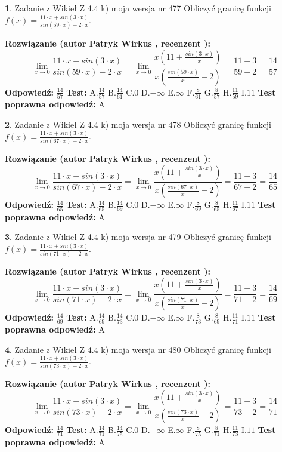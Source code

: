 \documentclass[12pt, a4paper]{article}
\theoremstyle{definition} %
\newtheorem{zad}{}
\newcommand{\zadStart}[1]{\begin{zad}#1\newline}
\newcommand{\zadStop}{\end{zad}}
\newcommand{\rozwStart}[2]{\noindent \textbf{Rozwiązanie (autor #1 , recenzent #2): }\newline}
\newcommand{\rozwStop}{\newline}
\newcommand{\odpStart}{\noindent \textbf{Odpowiedź:}\newline}
\newcommand{\odpStop}{\newline}
\newcommand{\testStart}{\noindent \textbf{Test:}\newline}
\newcommand{\testStop}{\newline}
\newcommand{\kluczStart}{\noindent \textbf{Test poprawna odpowiedź:}\newline}
\newcommand{\kluczStop}{\newline}
\begin{document}
\zadStart{Zadanie z Wikieł Z 4.4 k) moja wersja nr 477}
Obliczyć granicę funkcji $f(x)=\frac{11\cdot x +sin(3\cdot x)}{sin(59\cdot x) -2\cdot x}$.
\zadStop
\rozwStart{Patryk Wirkus}{}
$$\lim\limits_{x\to 0}\frac{11\cdot x +sin(3\cdot x)}{sin(59\cdot x) -2\cdot x}
=\lim\limits_{x\to 0}\frac{x(11+\frac{sin(3\cdot x)}{x})}{x(\frac{sin(59\cdot x)}{x}-2)}
=\frac{11+3}{59-2} = \frac{14}{57}$$
\rozwStop
\odpStart
$\frac{14}{57}$
\odpStop
\testStart
A.$\frac{14}{57}$
B.$\frac{14}{61}$
C.$0$
D.$-\infty$
E.$\infty$
F.$\frac{8}{61}$
G.$\frac{8}{57}$
H.$\frac{11}{59}$
I.$11$
\testStop
\kluczStart
A
\kluczStop



\zadStart{Zadanie z Wikieł Z 4.4 k) moja wersja nr 478}
Obliczyć granicę funkcji $f(x)=\frac{11\cdot x +sin(3\cdot x)}{sin(67\cdot x) -2\cdot x}$.
\zadStop
\rozwStart{Patryk Wirkus}{}
$$\lim\limits_{x\to 0}\frac{11\cdot x +sin(3\cdot x)}{sin(67\cdot x) -2\cdot x}
=\lim\limits_{x\to 0}\frac{x(11+\frac{sin(3\cdot x)}{x})}{x(\frac{sin(67\cdot x)}{x}-2)}
=\frac{11+3}{67-2} = \frac{14}{65}$$
\rozwStop
\odpStart
$\frac{14}{65}$
\odpStop
\testStart
A.$\frac{14}{65}$
B.$\frac{14}{69}$
C.$0$
D.$-\infty$
E.$\infty$
F.$\frac{8}{69}$
G.$\frac{8}{65}$
H.$\frac{11}{67}$
I.$11$
\testStop
\kluczStart
A
\kluczStop



\zadStart{Zadanie z Wikieł Z 4.4 k) moja wersja nr 479}
Obliczyć granicę funkcji $f(x)=\frac{11\cdot x +sin(3\cdot x)}{sin(71\cdot x) -2\cdot x}$.
\zadStop
\rozwStart{Patryk Wirkus}{}
$$\lim\limits_{x\to 0}\frac{11\cdot x +sin(3\cdot x)}{sin(71\cdot x) -2\cdot x}
=\lim\limits_{x\to 0}\frac{x(11+\frac{sin(3\cdot x)}{x})}{x(\frac{sin(71\cdot x)}{x}-2)}
=\frac{11+3}{71-2} = \frac{14}{69}$$
\rozwStop
\odpStart
$\frac{14}{69}$
\odpStop
\testStart
A.$\frac{14}{69}$
B.$\frac{14}{73}$
C.$0$
D.$-\infty$
E.$\infty$
F.$\frac{8}{73}$
G.$\frac{8}{69}$
H.$\frac{11}{71}$
I.$11$
\testStop
\kluczStart
A
\kluczStop



\zadStart{Zadanie z Wikieł Z 4.4 k) moja wersja nr 480}
Obliczyć granicę funkcji $f(x)=\frac{11\cdot x +sin(3\cdot x)}{sin(73\cdot x) -2\cdot x}$.
\zadStop
\rozwStart{Patryk Wirkus}{}
$$\lim\limits_{x\to 0}\frac{11\cdot x +sin(3\cdot x)}{sin(73\cdot x) -2\cdot x}
=\lim\limits_{x\to 0}\frac{x(11+\frac{sin(3\cdot x)}{x})}{x(\frac{sin(73\cdot x)}{x}-2)}
=\frac{11+3}{73-2} = \frac{14}{71}$$
\rozwStop
\odpStart
$\frac{14}{71}$
\odpStop
\testStart
A.$\frac{14}{71}$
B.$\frac{14}{75}$
C.$0$
D.$-\infty$
E.$\infty$
F.$\frac{8}{75}$
G.$\frac{8}{71}$
H.$\frac{11}{73}$
I.$11$
\testStop
\kluczStart
A
\kluczStop
\end{document}

